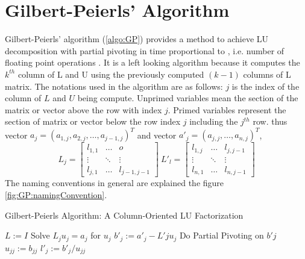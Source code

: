 \section{ Gilbert-Peierls' Algorithm}

Gilbert-Peierls' algorithm \cite{GPAlgo} (\ref{algo:GP}) provides a method to achieve LU decomposition with partial 
pivoting in time proportional to , i.e. number of floating point
operations \cite{GPAlgo}. It is a left looking algorithm because it computes the \(k^{th}\)
column of L and U using the previously computed \((k-1)\)  columns of L matrix. The notations used in the 
algorithm are as follows: $j$ is the index of the column of $L$ and $U$ being compute.
Unprimed variables mean the section of the matrix or vector above the row with index $j$.
Primed variables represent the section of matrix or vector below the row index $j$ including 
the $j^{th}$ row. thus vector $a_j = (a_{1,j}, a_{2,j}, \dots, a_{j-1,j})^T$ and 
vector $a'_j = (a_{j,j}, \dots, a_{n,j})^T$,
$$ L_j = 
\begin{bmatrix}
    l_{1,1} & \dots & o \\
    \vdots & \ddots  & \vdots \\
    l_{j,1} & \dots & l_{j-1, j-1}
\end{bmatrix} \ L'_l = 
\begin{bmatrix}
    l_{1,j} & \dots & l_{j, j-1} \\
    \vdots & \ddots  & \vdots \\
    l_{n,1} & \dots & l_{n, j-1}
\end{bmatrix}
$$
The naming conventions in general are explained the figure \ref{fig:GP:namingConvention}. \\

\begin{algorithm}
    \caption{Gilbert-Peierls Algorithm: A Column-Oriented LU Factorization
        \label{algo:GP}}
    \begin{algorithmic}[1]
        \Statex
        \State $L := I$
            \State Solve $L_j u_j = a_j$ for $u_j$
            \State $b'_j := a'_j - L'j u_j$
            \State Do Partial Pivoting on $b'j$
            \State $u_{jj} := b_{jj}$
            \State $l'_j := b'_j / u_{jj}$
        \EndFor
    \end{algorithmic}
\end{algorithm}


